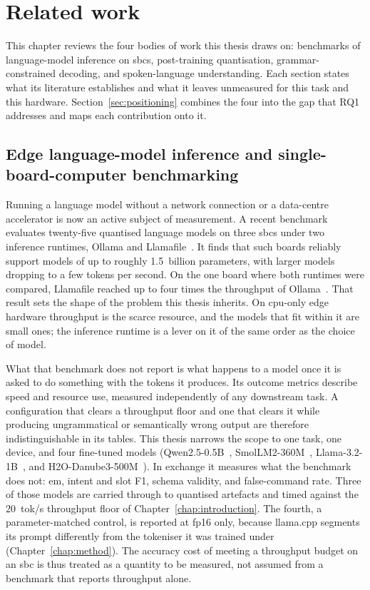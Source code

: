 \chapter{Related work}
\label{chap:related-work}
\enlargethispage{\baselineskip}

This chapter reviews the four bodies of work this thesis draws on: benchmarks of language-model
inference on \glspl{sbc}, post-training quantisation, grammar-constrained decoding, and
spoken-language understanding. Each section states what its literature establishes and what it
leaves unmeasured for this task and this hardware. Section~\ref{sec:positioning} combines the four
into the gap that RQ1 addresses and maps each contribution onto it.

\section{Edge language-model inference and single-board-computer benchmarking}
Running a language model without a network connection or a data-centre accelerator is now an
active subject of measurement. A recent benchmark evaluates twenty-five quantised language
models on three \glspl{sbc} under two inference runtimes, Ollama and
Llamafile~\cite{sbc2025}. It finds that such boards reliably support models of up to roughly
1.5~billion parameters, with larger models dropping to a few tokens per second. On the
one board where both runtimes were compared, Llamafile reached up to four times the throughput of
Ollama~\cite{sbc2025}. That result sets the shape of the problem this thesis inherits. On
\gls{cpu}-only edge hardware throughput is the scarce resource, and the models that fit within it
are small ones; the inference runtime is a lever on it of the same order as the choice of model.

What that benchmark does not report is what happens to a model once it is asked to do something
with the tokens it produces. Its outcome metrics describe speed and resource use, measured
independently of any downstream task. A configuration that clears a throughput floor and one that
clears it while producing ungrammatical or semantically wrong output are therefore
indistinguishable in its tables. This thesis narrows the scope to one task, one device, and four
fine-tuned models (Qwen2.5-0.5B~\cite{qwen25}, SmolLM2-360M~\cite{smollm2},
Llama-3.2-1B~\cite{llama32}, and H2O-Danube3-500M~\cite{danube3}). In exchange it measures what
the benchmark does not: \gls{em}, intent and slot F1, schema validity, and false-command rate.
Three of those models are carried through to quantised artefacts and timed against the
20~tok/s throughput floor of Chapter~\ref{chap:introduction}. The fourth, a parameter-matched
control, is reported at fp16 only, because llama.cpp segments its prompt differently from the
tokeniser it was trained under (Chapter~\ref{chap:method}). The accuracy cost of meeting a
throughput budget on an \gls{sbc} is thus treated as a quantity to be measured, not
assumed from a benchmark that reports throughput alone.

